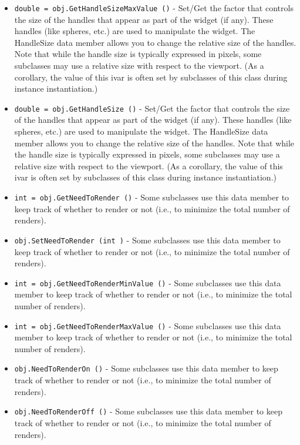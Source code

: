 \begin{itemize}
\item  \verb|double = obj.GetHandleSizeMaxValue ()| -  Set/Get the factor that controls the size of the handles that appear as
 part of the widget (if any). These handles (like spheres, etc.)  are
 used to manipulate the widget. The HandleSize data member allows you
 to change the relative size of the handles. Note that while the handle
 size is typically expressed in pixels, some subclasses may use a relative size
 with respect to the viewport. (As a corollary, the value of this ivar is often
 set by subclasses of this class during instance instantiation.)

\item  \verb|double = obj.GetHandleSize ()| -  Set/Get the factor that controls the size of the handles that appear as
 part of the widget (if any). These handles (like spheres, etc.)  are
 used to manipulate the widget. The HandleSize data member allows you
 to change the relative size of the handles. Note that while the handle
 size is typically expressed in pixels, some subclasses may use a relative size
 with respect to the viewport. (As a corollary, the value of this ivar is often
 set by subclasses of this class during instance instantiation.)

\item  \verb|int = obj.GetNeedToRender ()| -  Some subclasses use this data member to keep track of whether to render
 or not (i.e., to minimize the total number of renders).

\item  \verb|obj.SetNeedToRender (int )| -  Some subclasses use this data member to keep track of whether to render
 or not (i.e., to minimize the total number of renders).

\item  \verb|int = obj.GetNeedToRenderMinValue ()| -  Some subclasses use this data member to keep track of whether to render
 or not (i.e., to minimize the total number of renders).

\item  \verb|int = obj.GetNeedToRenderMaxValue ()| -  Some subclasses use this data member to keep track of whether to render
 or not (i.e., to minimize the total number of renders).

\item  \verb|obj.NeedToRenderOn ()| -  Some subclasses use this data member to keep track of whether to render
 or not (i.e., to minimize the total number of renders).

\item  \verb|obj.NeedToRenderOff ()| -  Some subclasses use this data member to keep track of whether to render
 or not (i.e., to minimize the total number of renders).


\end{itemize}
